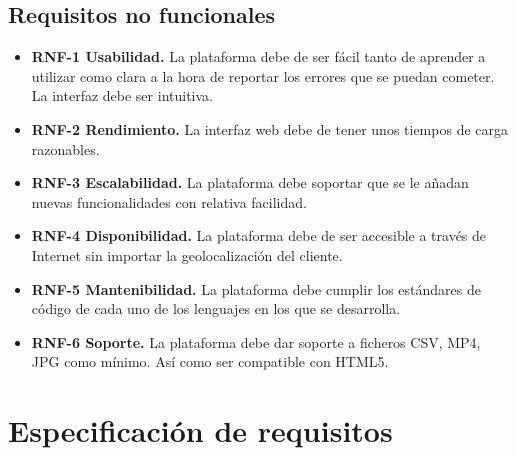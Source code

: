 \subsection{Requisitos no funcionales}
\begin{itemize}
\item \textbf{RNF-1 Usabilidad.} La plataforma debe de ser fácil tanto de aprender a utilizar como clara a la hora de reportar los errores que se puedan cometer. La interfaz debe ser intuitiva.
\item \textbf{RNF-2 Rendimiento.} La interfaz web debe de tener unos tiempos de carga razonables.
\item \textbf{RNF-3 Escalabilidad.} La plataforma debe soportar que se le añadan nuevas funcionalidades con relativa facilidad.
\item \textbf{RNF-4 Disponibilidad.} La plataforma debe de ser accesible a través de Internet sin importar la geolocalización del cliente.
\item \textbf{RNF-5 Mantenibilidad.} La plataforma debe cumplir los estándares de código de cada uno de los lenguajes en los que se desarrolla. 
\item \textbf{RNF-6 Soporte.} La plataforma debe dar soporte a ficheros CSV, MP4, JPG como mínimo. Así como ser compatible con HTML5.
\end{itemize}

\section{Especificación de requisitos}


